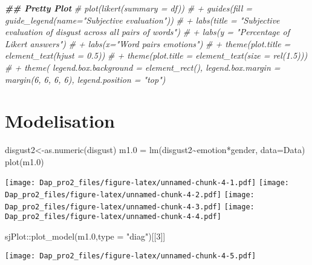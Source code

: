 \documentclass[
]{article}
\newenvironment{Shaded}{\begin{snugshade}}{\end{snugshade}}
\newcommand{\AttributeTok}[1]{\textcolor[rgb]{0.77,0.63,0.00}{#1}}
\newcommand{\CommentTok}[1]{\textcolor[rgb]{0.56,0.35,0.01}{\textit{#1}}}
\newcommand{\DecValTok}[1]{\textcolor[rgb]{0.00,0.00,0.81}{#1}}
\newcommand{\DocumentationTok}[1]{\textcolor[rgb]{0.56,0.35,0.01}{\textbf{\textit{#1}}}}
\newcommand{\FloatTok}[1]{\textcolor[rgb]{0.00,0.00,0.81}{#1}}
\newcommand{\FunctionTok}[1]{\textcolor[rgb]{0.00,0.00,0.00}{#1}}
\newcommand{\NormalTok}[1]{#1}
\newcommand{\OtherTok}[1]{\textcolor[rgb]{0.56,0.35,0.01}{#1}}
\newcommand{\SpecialCharTok}[1]{\textcolor[rgb]{0.00,0.00,0.00}{#1}}
\newcommand{\StringTok}[1]{\textcolor[rgb]{0.31,0.60,0.02}{#1}}
\begin{document}
\begin{Shaded}
\begin{Highlighting}[]
\DocumentationTok{\#\# Pretty Plot}
\CommentTok{\# plot(likert(summary = df))}
\CommentTok{\# + guides(fill = guide\_legend(name="Subjective evaluation"))}
\CommentTok{\# + labs(title = "Subjective evaluation of disgust across all pairs of words")}
\CommentTok{\# + labs(y = "Percentage of Likert answers")}
\CommentTok{\# + labs(x="Word pairs\textquotesingle{} emotions")}
\CommentTok{\# + theme(plot.title = element\_text(hjust = 0.5))}
\CommentTok{\# + theme(plot.title = element\_text(size = rel(1.5)))}
\CommentTok{\# + theme( legend.box.background = element\_rect(), legend.box.margin = margin(6, 6, 6, 6), legend.position = "top")}
\end{Highlighting}
\end{Shaded}

\hypertarget{modelisation}{%
\section{Modelisation}\label{modelisation}}

\begin{Shaded}
\begin{Highlighting}[]
\NormalTok{disgust2}\OtherTok{\textless{}{-}}\FunctionTok{as.numeric}\NormalTok{(disgust)}
\NormalTok{m1}\FloatTok{.0} \OtherTok{=} \FunctionTok{lm}\NormalTok{(disgust2}\SpecialCharTok{\textasciitilde{}}\NormalTok{emotion}\SpecialCharTok{*}\NormalTok{gender, }\AttributeTok{data=}\NormalTok{Data)}
\FunctionTok{plot}\NormalTok{(m1}\FloatTok{.0}\NormalTok{)}
\end{Highlighting}
\end{Shaded}

\texttt{[image: Dap\_pro2\_files/figure-latex/unnamed-chunk-4-1.pdf]}
\texttt{[image: Dap\_pro2\_files/figure-latex/unnamed-chunk-4-2.pdf]}
\texttt{[image: Dap\_pro2\_files/figure-latex/unnamed-chunk-4-3.pdf]}
\texttt{[image: Dap\_pro2\_files/figure-latex/unnamed-chunk-4-4.pdf]}

\begin{Shaded}
\begin{Highlighting}[]
\NormalTok{sjPlot}\SpecialCharTok{::}\FunctionTok{plot\_model}\NormalTok{(m1}\FloatTok{.0}\NormalTok{,}\AttributeTok{type =} \StringTok{"diag"}\NormalTok{)[[}\DecValTok{3}\NormalTok{]]}
\end{Highlighting}
\end{Shaded}

\texttt{[image: Dap\_pro2\_files/figure-latex/unnamed-chunk-4-5.pdf]}
\end{document}
